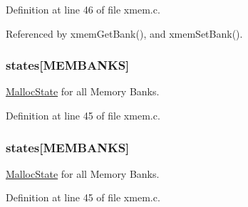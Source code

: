 Definition at line 46 of file xmem.\-c.



Referenced by xmem\-Get\-Bank(), and xmem\-Set\-Bank().

\hypertarget{group__xmem_gabe6eb8575dfb63d41e3ca7fe774d1b27}{
\subsubsection[{states}]{ states\mbox{[}{\bf M\-E\-M\-B\-A\-N\-K\-S}\mbox{]}}}\label{group__xmem_gabe6eb8575dfb63d41e3ca7fe774d1b27}


\hyperlink{struct_malloc_state}{Malloc\-State} for all Memory Banks. 



Definition at line 45 of file xmem.\-c.

\hypertarget{group__xmem_gabe6eb8575dfb63d41e3ca7fe774d1b27}{
\subsubsection[{states}]{ states\mbox{[}{\bf M\-E\-M\-B\-A\-N\-K\-S}\mbox{]}}}\label{group__xmem_gabe6eb8575dfb63d41e3ca7fe774d1b27}


\hyperlink{struct_malloc_state}{Malloc\-State} for all Memory Banks. 



Definition at line 45 of file xmem.\-c.

